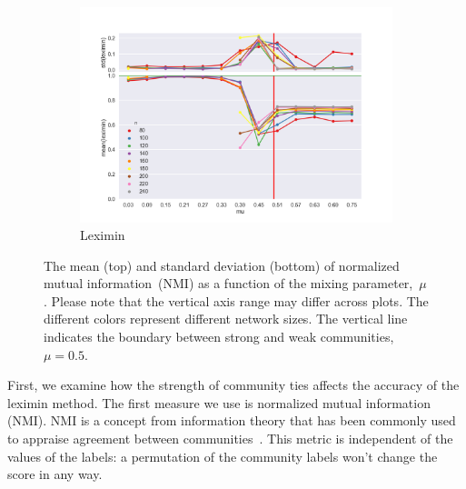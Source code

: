 \begin{figure}
    \begin{subfigure}[b]{0.32\textwidth}
        \includegraphics[width=\textwidth]{fig/nmi_vs_mu_leximin}
        \caption{Leximin}
        \label{fig:mouse}
    \end{subfigure}

  \caption{The mean (top) and standard deviation (bottom) of normalized mutual information~(NMI) as a function of the mixing parameter,~$\mu$. Please note that the vertical axis range may differ across plots. The different colors represent different network sizes. The vertical line indicates the boundary between strong and weak communities, $\mu = 0.5$.}
  \label{fig:mu_nmi}
\end{figure}

First, we examine how the strength of community ties affects the accuracy of the leximin method. The first measure we use is normalized mutual information (NMI). NMI is a concept from information theory that has been commonly used to appraise agreement between communities~\cite{danon2005comparing}. This metric is independent of the values of the labels: a permutation of the community labels won't change the score in any way.

